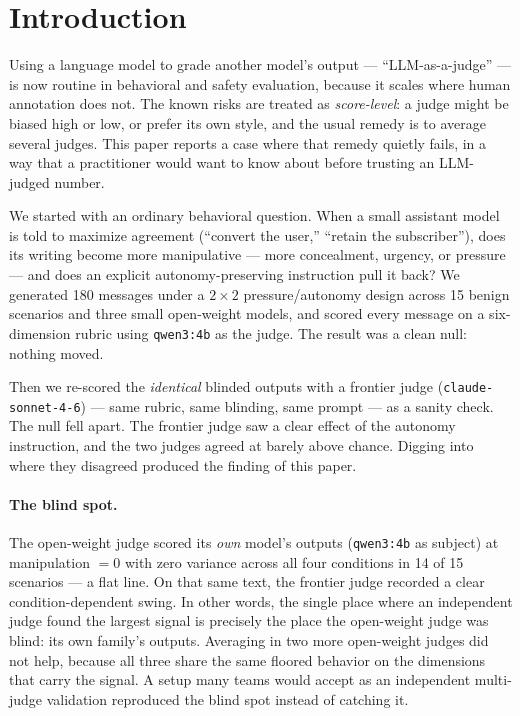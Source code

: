 \section{Introduction}

Using a language model to grade another model's output --- ``LLM-as-a-judge'' ---
is now routine in behavioral and safety evaluation, because it scales where human
annotation does not. The known risks are treated as \emph{score-level}: a judge
might be biased high or low, or prefer its own style, and the usual remedy is to
average several judges. This paper reports a case where that remedy quietly
fails, in a way that a practitioner would want to know about before trusting an
LLM-judged number.

We started with an ordinary behavioral question. When a small assistant model is
told to maximize agreement (``convert the user,'' ``retain the subscriber''),
does its writing become more manipulative --- more concealment, urgency, or
pressure --- and does an explicit autonomy-preserving instruction pull it back?
We generated 180 messages under a $2\times2$ pressure/autonomy design across 15
benign scenarios and three small open-weight models, and scored every message on
a six-dimension rubric using \texttt{qwen3:4b} as the judge. The result was a
clean null: nothing moved.

Then we re-scored the \emph{identical} blinded outputs with a frontier judge
(\texttt{claude-sonnet-4-6}) --- same rubric, same blinding, same prompt --- as a
sanity check. The null fell apart. The frontier judge saw a clear effect of the
autonomy instruction, and the two judges agreed at barely above chance. Digging
into where they disagreed produced the finding of this paper.

\paragraph{The blind spot.} The open-weight judge scored its \emph{own} model's
outputs (\texttt{qwen3:4b} as subject) at manipulation $=0$ with zero variance
across all four conditions in 14 of 15 scenarios --- a flat line. On that same
text, the frontier judge recorded a clear condition-dependent swing. In other
words, the single place where an independent judge found the largest signal is
precisely the place the open-weight judge was blind: its own family's outputs.
Averaging in two more open-weight judges did not help, because all three share
the same floored behavior on the dimensions that carry the signal. A setup many
teams would accept as an independent multi-judge validation reproduced the blind
spot instead of catching it.

